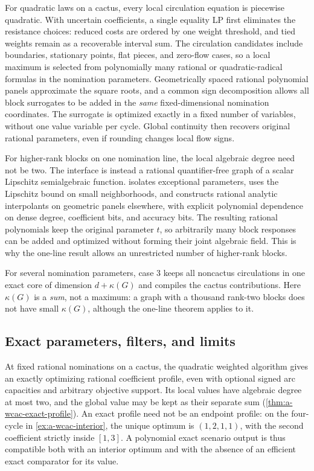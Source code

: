 For quadratic laws on a cactus, every local circulation equation is
piecewise quadratic. With uncertain coefficients, a single equality LP first
eliminates the resistance choices: reduced costs are ordered by one
weight threshold, and tied weights remain as a recoverable interval sum.
The circulation candidates include boundaries, stationary points, flat
pieces, and zero-flow cases, so a local maximum is selected from
polynomially many rational or quadratic-radical formulas in the
nomination parameters. Geometrically spaced rational polynomial panels
approximate the square roots, and a common sign decomposition allows
all block surrogates to be added in the \emph{same} fixed-dimensional
nomination coordinates. The surrogate is optimized exactly in a fixed
number of variables, without one value variable per cycle. Global
continuity then recovers original rational parameters, even if rounding
changes local flow signs.

For higher-rank blocks on one nomination line, the local algebraic
degree need not be two. The interface is instead a rational
quantifier-free graph of a scalar Lipschitz semialgebraic function.
 isolates exceptional parameters, uses the
Lipschitz bound on small neighborhoods, and constructs rational analytic
interpolants on geometric panels elsewhere, with explicit polynomial
dependence on dense degree, coefficient bits, and accuracy bits. The
resulting rational polynomials keep the original parameter $t$, so
arbitrarily many block responses can be added and optimized without
forming their joint algebraic field. This is why the one-line result
allows an unrestricted number of higher-rank blocks.

For several nomination parameters, case 3 keeps all noncactus
circulations in one exact core of dimension $d+\kappa(G)$ and compiles
the cactus contributions. Here $\kappa(G)$ is a \emph{sum}, not a
maximum: a graph with a thousand rank-two blocks does not have small
$\kappa(G)$, although the one-line theorem applies to it.

\subsection{Exact parameters, filters, and limits}

At fixed rational nominations on a cactus, the quadratic weighted
algorithm gives an exactly optimizing rational coefficient profile,
even with optional signed arc capacities and arbitrary objective support.
Its local values have algebraic degree at most two, and the global
value may be kept as their separate sum (\cref{thm:a-wcac-exact-profile}).
An exact profile need not be an endpoint profile: on the four-cycle in
\cref{ex:a-wcac-interior}, the unique optimum is $(1,2,1,1)$, with the
second coefficient strictly inside $[1,3]$. A polynomial exact scenario
output is thus compatible both with an interior optimum and with the
absence of an efficient exact comparator for its value.

